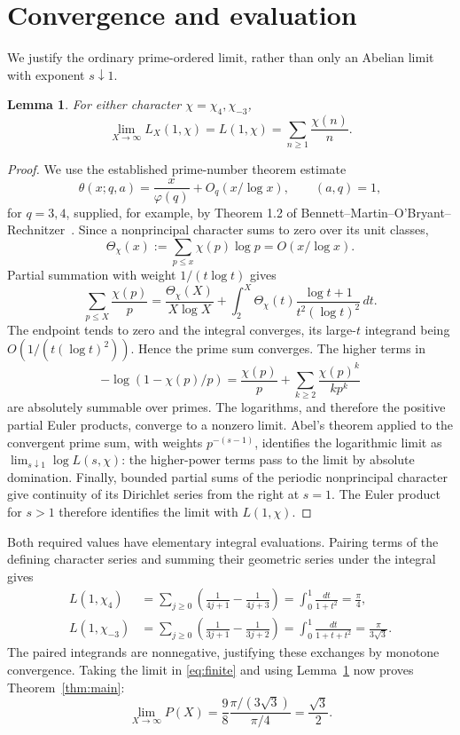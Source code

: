 \documentclass[10pt]{article}
\newtheorem{lemma}{Lemma}
\begin{document}
\section{Convergence and evaluation}
We justify the ordinary prime-ordered limit, rather than only an
Abelian limit with exponent $s\downarrow1$.
\begin{lemma}\label{lem:convergence}
For either character $\chi=\chi_4,\chi_{-3}$,
\[
 \lim_{X\to\infty}L_X(1,\chi)=L(1,\chi)
 =\sum_{n\ge1}\frac{\chi(n)}n.
\]
\end{lemma}
\begin{proof}
We use the established prime-number theorem estimate
\[
 \theta(x;q,a)=\frac{x}{\varphi(q)}+O_q(x/\log x),
 \qquad (a,q)=1,
\]
for $q=3,4$, supplied, for example, by Theorem 1.2 of
Bennett--Martin--O'Bryant--Rechnitzer~\cite{bmor}.
Since a nonprincipal character sums to zero over its unit classes,
\[
 \Theta_\chi(x):=\sum_{p\le x}\chi(p)\log p=O(x/\log x).
\]
Partial summation with weight $1/(t\log t)$ gives
\[
 \sum_{p\le X}\frac{\chi(p)}p
 =\frac{\Theta_\chi(X)}{X\log X}
 +\int_2^X\Theta_\chi(t)\frac{\log t+1}{t^2(\log t)^2}\,dt.
\]
The endpoint tends to zero and the integral converges, its large-$t$
integrand being $O(1/(t(\log t)^2))$. Hence the prime sum converges.
The higher terms in
\[
 -\log(1-\chi(p)/p)=\frac{\chi(p)}p+
       \sum_{k\ge2}\frac{\chi(p)^k}{kp^k}
\]
are absolutely summable over primes. The logarithms, and therefore
the positive partial Euler products, converge to a nonzero limit.
Abel's theorem applied to the convergent prime sum, with weights
$p^{-(s-1)}$, identifies the logarithmic limit as
$\lim_{s\downarrow1}\log L(s,\chi)$: the higher-power terms pass
to the limit by absolute domination. Finally, bounded partial sums
of the periodic nonprincipal character give continuity of its
Dirichlet series from the right at $s=1$. The Euler product for
$s>1$ therefore identifies the limit with $L(1,\chi)$.
\end{proof}

Both required values have elementary integral evaluations. Pairing
terms of the defining character series and summing their geometric
series under the integral gives
\begin{align*}
 L(1,\chi_4)&=\sum_{j\ge0}\left(\frac1{4j+1}-\frac1{4j+3}\right)
   =\int_0^1\frac{dt}{1+t^2}=\frac\pi4,\\
 L(1,\chi_{-3})&=\sum_{j\ge0}\left(\frac1{3j+1}-\frac1{3j+2}\right)
   =\int_0^1\frac{dt}{1+t+t^2}=\frac\pi{3\sqrt3}.
\end{align*}
The paired integrands are nonnegative, justifying these exchanges
by monotone convergence. Taking the limit in \eqref{eq:finite}
and using Lemma~\ref{lem:convergence} now proves Theorem~\ref{thm:main}:
\[
 \lim_{X\to\infty}P(X)=\frac98\frac{\pi/(3\sqrt3)}{\pi/4}
 =\frac{\sqrt3}{2}.
\]
\end{document}
